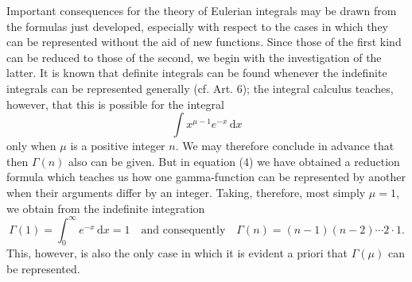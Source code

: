 \documentclass[11pt]{article}
\newcommand{\dd}{\,\mathrm d}
\begin{document}
Important consequences for the theory of Eulerian integrals may be drawn from the formulas just developed, especially with respect to the cases in which they can be represented without the aid of new functions. Since those of the first kind can be reduced to those of the second, we begin with the investigation of the latter. It is known that definite integrals can be found whenever the indefinite integrals can be represented generally (cf. Art. 6); the integral calculus teaches, however, that this is possible for the integral
\[
\int x^{\mu-1}e^{-x}\dd x
\]
only when $\mu$ is a positive integer $n$. We may therefore conclude in advance that then $\Gamma(n)$ also can be given. But in equation (4) we have obtained a reduction formula which teaches us how one gamma-function can be represented by another when their arguments differ by an integer. Taking, therefore, most simply $\mu=1$, we obtain from the indefinite integration
\begin{equation}
\Gamma(1)=\int_0^\infty e^{-x}\dd x=1 \quad\text{and consequently}\quad
\Gamma(n)=(n-1)(n-2)\cdots2\cdot1.
\tag{5}
\end{equation}
This, however, is also the only case in which it is evident a priori that $\Gamma(\mu)$ can be represented.
\end{document}
